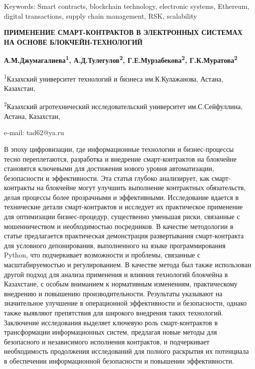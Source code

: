 Keywords: Smart contracts, blockchain technology, electronic systems,
Ethereum, digital transactions, supply chain management, RSK,
scalability

\begin{center}
{\large\bfseries ПРИМЕНЕНИЕ СМАРТ-КОНТРАКТОВ В ЭЛЕКТРОННЫХ СИСТЕМАХ НА ОСНОВЕ
БЛОКЧЕЙН-ТЕХНОЛОГИЙ}

{\bfseries А.М.Джумагалиева\textsuperscript{1},
А.Д.Тулегулов\textsuperscript{2}\envelope, Г.Е.Мурзабекова\textsuperscript{2},
Г.К.Муратова\textsuperscript{2}}

\textsuperscript{1}Казахский университет технологий и бизнеса
им.К.Кулажанова, Астана, Казахстан,

\textsuperscript{2}Казахский агротехнический исследовательский
университет им.С.Сейфуллина, Астана, Казахстан,

e-mail: tad62@ya.ru
\end{center}

В эпоху цифровизации, где информационные технологии и бизнес-процессы
тесно переплетаются, разработка и внедрение смарт-контрактов на
блокчейне становятся ключевыми для достижения нового уровня
автоматизации, безопасности и эффективности. Эта статья глубоко
анализирует, как смарт-контракты на блокчейне могут улучшить выполнение
контрактных обязательств, делая процессы более прозрачными и
эффективными. Исследование вдается в технические детали смарт-контрактов
и исследует их практическое применение для оптимизации бизнес-процедур,
существенно уменьшая риски, связанные с мошенничеством и необходимостью
посредников. В качестве методологии в статье предлагается практическая
демонстрация развертывания смарт-контракта для условного депонирования,
выполненного на языке программирования Python, что подчеркивает
возможности и проблемы, связанные с масштабируемостью и регулированием.
В качестве метода был также использован другой подход для анализа
применения и влияния технологий блокчейна в Казахстане, с особым
вниманием к нормативным изменениям, практическому внедрению и повышению
производительности. Результаты указывают на значительное улучшение в
операционной эффективности и безопасности, однако также выявляют
препятствия для широкого внедрения таких технологий. Заключение
исследования выделяет ключевую роль смарт-контрактов в трансформации
информационных систем, предлагая новые методы для безопасного и
независимого исполнения контрактов, и подчеркивает необходимость
продолжения исследований для полного раскрытия их потенциала в
обеспечении информационной безопасности и повышении эффективности.

